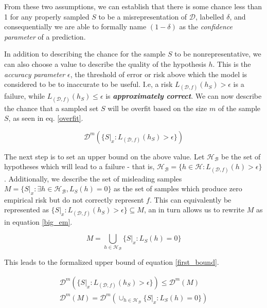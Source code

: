 \documentclass[10pt,conference]{IEEEtran}
\def\dist{\mathcal{D}}
\def\hypspace{\mathcal{H}}
\def\bad{\mathcal{B}}
\begin{document}
    From these two assumptions, we can establish that there is some chance less than 1 for any properly sampled $S$ to be a misrepresentation of $\dist$, labelled $\delta$, and consequentially we are able to formally name $(1-\delta)$ as the \emph{confidence parameter} of a prediction\cite{shais}.

    In addition to describing the chance for the sample $S$ to be nonrepresentative, we can also choose a value to describe the quality of the hypothesis $h$. This is the \emph{accuracy parameter} $\epsilon$, the threshold of error or risk above which the model is considered to be to inaccurate to be useful\cite{shais}. I.e, a risk $L_{(\dist, f)}(h_S) > \epsilon$ is a failure, while $L_{(\dist, f)}(h_S) \leq \epsilon$ is \textbf{\emph{approximately correct}}\cite{shais}. We can now describe the chance that a sampled set $S$ will be overfit based on the size $m$ of the sample $S$, as seen in eq. \ref{overfit}\cite{shais}.

    \begin{equation}
      \label{overfit}
      \dist^m(\{S|_x:L_{(\dist, f)}(h_S)>\epsilon\})
    \end{equation}

    The next step is to set an upper bound on the above value. Let $\hypspace_\bad$ be the set of hypotheses which will lead to a failure - that is, $\hypspace_\bad = \{h \in \hypspace: L_{(\dist, f)}(h) > \epsilon\}$\cite{shais}. Additionally, we describe the set of misleading samples $M = \{S|_x: \exists h \in \hypspace_\bad, L_S(h) = 0\}$ as the set of samples which produce zero empirical risk but do not correctly represent $f$\cite{shais}. This can equivalently be represented as $\{S|_x : L_{(\dist, f)}(h_S) > \epsilon \} \subseteq M$, an in turn allows us to rewrite $M$ as in equation \ref{big_em}\cite{shais}.

    \begin{equation}
      \label{big_em}
      M = \bigcup_{h\in\hypspace_\bad} \{S|_x:L_S(h) = 0\}
    \end{equation}

    This leads to the formalized upper bound of equation \ref{first_bound}\cite{shais}.

    \begin{equation}
      \label{first_bound}
      \begin{aligned}
      \dist^m(\{S|_x:L_{(\dist, f)}(h_S)>\epsilon\}) \leq \dist^m(M) \\ \dist^m(M) = \dist^m(\cup_{h\in\hypspace_\bad}\{S|_x:L_S(h) = 0\})
      \end{aligned}
    \end{equation}
\end{document}
